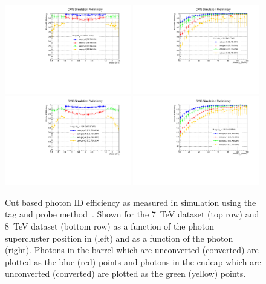 \begin{figure}
  \includegraphics[width=0.49\textwidth]{selec_and_cats/plots/eff_7TeV_eta.pdf}
  \includegraphics[width=0.49\textwidth]{selec_and_cats/plots/eff_7TeV_pt.pdf}
  \includegraphics[width=0.49\textwidth]{selec_and_cats/plots/eff_8TeV_eta.pdf}
  \includegraphics[width=0.49\textwidth]{selec_and_cats/plots/eff_8TeV_pt.pdf}
  \caption[Cut based photon ID efficiency as measured in \Zee \MC simulation]{Cut based photon ID efficiency as measured in \Zee \MC simulation using the tag and probe method~\cite{tag_and_probe}. Shown for the 7~TeV dataset (top row) and 8~TeV dataset (bottom row) as a function of the photon supercluster position in \eta (left) and as a function of the photon \pT (right). Photons in the barrel which are unconverted (converted) are plotted as the blue (red) points and photons in the endcap which are unconverted (converted) are plotted as the green (yellow) points.}
  \label{fig:cic_efficiency}
\end{figure}

